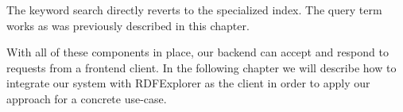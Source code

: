 The keyword search directly reverts to the specialized index. The query term works as was previously described in this chapter.

With all of these components in place, our backend can accept and respond to requests from a frontend client. In the following chapter we will describe how to integrate our system with RDFExplorer as the client in order to apply our approach for a concrete use-case.


